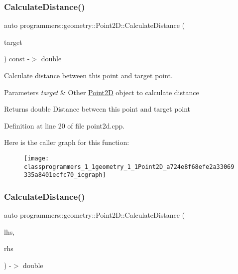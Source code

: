 \subsubsection{\texorpdfstring{Calculate\+Distance()}{CalculateDistance()}\hspace{0.1cm}{\footnotesize\ttfamily [1/2]}}
{\footnotesize\ttfamily auto programmers\+::geometry\+::\+Point2\+D\+::\+Calculate\+Distance (\begin{DoxyParamCaption}\item[{const \hyperlink{classprogrammers_1_1geometry_1_1Point2D}{Point2D} \&}]{target }\end{DoxyParamCaption}) const -\/$>$ double}



Calculate distance between this point and target point. 


\begin{DoxyParams}{Parameters}
{\em target} & Other \hyperlink{classprogrammers_1_1geometry_1_1Point2D}{Point2D} object to calculate distance \\
\hline
\end{DoxyParams}
\begin{DoxyReturn}{Returns}
double Distance between this point and target point 
\end{DoxyReturn}


Definition at line 20 of file point2d.\+cpp.

Here is the caller graph for this function\+:\nopagebreak
\begin{figure}[H]
\begin{center}
\leavevmode
\texttt{[image: classprogrammers\_1\_1geometry\_1\_1Point2D\_a724e8f68efe2a33069335a8401ecfc70\_icgraph]}
\end{center}
\end{figure}
\mbox{\label{classprogrammers_1_1geometry_1_1Point2D_a0aa082791c9cfceb5e58779c9fa1ecdf}} 
\subsubsection{\texorpdfstring{Calculate\+Distance()}{CalculateDistance()}\hspace{0.1cm}{\footnotesize\ttfamily [2/2]}}
{\footnotesize\ttfamily auto programmers\+::geometry\+::\+Point2\+D\+::\+Calculate\+Distance (\begin{DoxyParamCaption}\item[{const \hyperlink{classprogrammers_1_1geometry_1_1Point2D}{Point2D} \&}]{lhs,  }\item[{const \hyperlink{classprogrammers_1_1geometry_1_1Point2D}{Point2D} \&}]{rhs }\end{DoxyParamCaption}) -\/$>$ double\hspace{0.3cm}{\ttfamily [static]}}



